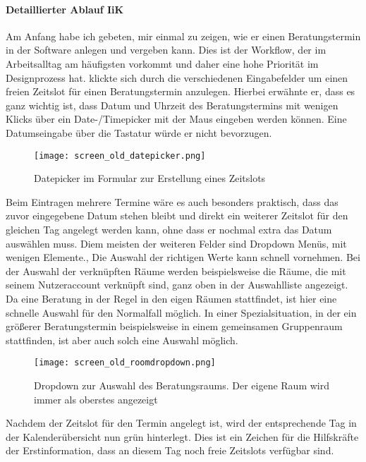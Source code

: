 \paragraph{Detaillierter Ablauf IiK}
Am Anfang habe ich \ipName gebeten, mir einmal zu zeigen, wie er einen
Beratungstermin in der Software anlegen und vergeben kann. Dies ist der
Workflow, der im Arbeitsalltag am häufigsten vorkommt und daher eine hohe
Priorität im Designprozess hat. \ipName klickte sich durch die verschiedenen
Eingabefelder um einen freien Zeitslot für einen Beratungstermin anzulegen.
Hierbei erwähnte er, dass es ganz wichtig ist, dass Datum und Uhrzeit des
Beratungstermins mit wenigen Klicks über ein Date-/Timepicker mit der Maus
eingeben werden können. Eine Datumseingabe über die Tastatur würde er nicht
bevorzugen.

\begin{figure}[h]
    \caption{Datepicker im Formular zur Erstellung eines Zeitslots}
    \centering
    \texttt{[image: screen\_old\_datepicker.png]}
\end{figure}

Beim Eintragen mehrere Termine wäre es auch besonders praktisch, dass das zuvor
eingegebene Datum stehen bleibt und direkt ein weiterer Zeitslot für den
gleichen Tag angelegt werden kann, ohne dass er nochmal extra das Datum
auswählen muss. Diem meisten der weiteren Felder sind Dropdown Menüs, mit
wenigen Elemente., Die Auswahl der richtigen Werte kann \ipName schnell
vornehmen. Bei der Auswahl der verknüpften Räume werden beispielsweise die
Räume, die mit seinem Nutzeraccount verknüpft sind, ganz oben in der
Auswahlliste angezeigt. Da eine Beratung in der Regel in den eigen Räumen
stattfindet, ist hier eine schnelle Auswahl für den Normalfall möglich. In
einer Spezialsituation, in der ein größerer Beratungstermin beispielsweise in
einem gemeinsamen Gruppenraum stattfinden, ist aber auch solch eine Auswahl
möglich.

\begin{figure}[h]
    \caption{Dropdown zur Auswahl des Beratungsraums. Der eigene Raum wird immer als oberstes angezeigt}
    \centering
    \texttt{[image: screen\_old\_roomdropdown.png]}
\end{figure}

Nachdem der Zeitslot für den Termin angelegt ist, wird der entsprechende Tag in
der Kalenderübersicht nun grün hinterlegt. Dies ist ein Zeichen für die
Hilfskräfte der Erstinformation, dass an diesem Tag noch freie Zeitslots
verfügbar sind.

